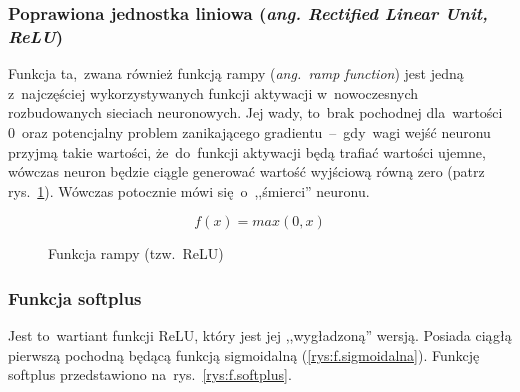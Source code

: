 \subsubsection{Poprawiona jednostka liniowa (\textit{ang. Rectified Linear Unit, ReLU})}
Funkcja ta,~zwana również funkcją rampy (\textit{ang.~ramp function}) jest jedną z~najczęściej wykorzystywanych funkcji
aktywacji w~nowoczesnych rozbudowanych sieciach neuronowych. Jej wady, to~brak pochodnej dla~wartości 0~oraz potencjalny
problem zanikającego gradientu~--~gdy~wagi wejść neuronu przyjmą takie wartości, że~do~funkcji aktywacji będą trafiać
wartości ujemne, wówczas neuron będzie ciągle generować wartość wyjściową równą zero (patrz rys.~\ref{rys:f.rampy}).
Wówczas potocznie mówi się~o~,,śmierci'' neuronu.

\begin{minipage}[t]{\textwidth}
\begin{equation}
	f(x) = max(0,x)
\end{equation}
\begin{figure}[H]
    \centering
    \caption{Funkcja rampy (tzw.~ReLU)}
    \label{rys:f.rampy}
\end{figure}
\end{minipage}

\subsubsection{Funkcja softplus}
Jest to~wartiant funkcji ReLU, który jest jej ,,wygładzoną'' wersją. Posiada ciągłą pierwszą pochodną będącą funkcją
sigmoidalną (\ref{rys:f.sigmoidalna}). Funkcję softplus przedstawiono na~rys.~\ref{rys:f.softplus}.

